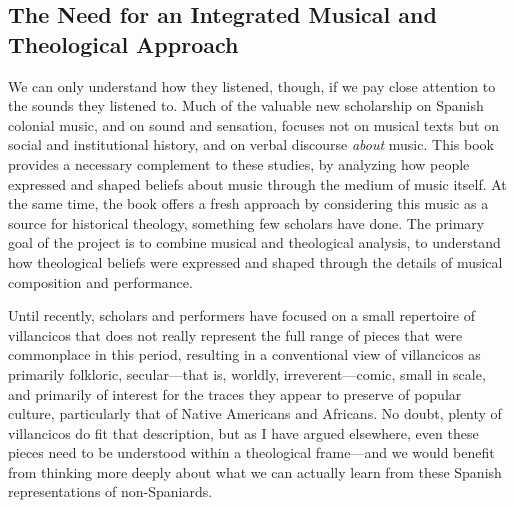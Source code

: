 \subsection{The Need for an Integrated Musical and Theological Approach}


We can only understand how they listened, though, if we pay close attention to
the sounds they listened to.
Much of the valuable new scholarship on Spanish colonial music, and on sound
and sensation, focuses not on musical texts but on social and institutional
history, and on verbal discourse \emph{about} music.%
    \Autocites{Baker:Harmony}{BakerKnighton:MusicUrbanSociety}
    {Irving:Colonial}{RamosKittrell:PlayingCathedral}
    {DellAntonio:Listening}
This book provides a necessary complement to these studies, by analyzing how
people expressed and shaped beliefs about music through the medium of music
itself.
At the same time, the book offers a fresh approach by considering this music as
a source for historical theology, something few scholars have done.
The primary goal of the project is to combine musical and theological analysis,
to understand how theological beliefs were expressed and shaped through the
details of musical composition and performance.

Until recently, scholars and performers have focused on a small repertoire of
villancicos that does not really represent the full range of pieces
that were commonplace in this period, resulting in a conventional view of
villancicos as primarily folkloric, secular---that is, worldly,
irreverent---comic, small in scale, and primarily of interest for the traces
they appear to preserve of popular culture, particularly that of Native
Americans and Africans.
No doubt, plenty of villancicos do fit that description, but as I have argued
elsewhere, even these pieces need to be understood within a theological
frame---and we would benefit from thinking more deeply about what we can
actually learn from these Spanish representations of non-Spaniards.%
    \Autocite{Cashner:BuildingSociety}


